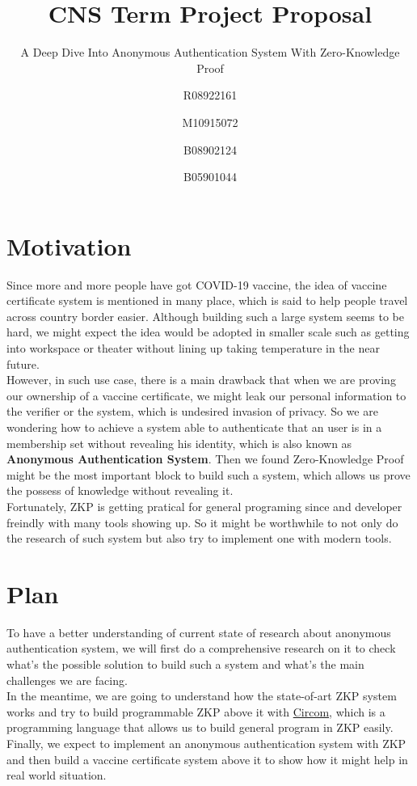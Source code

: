 \documentclass[sigconf]{acmart}
\title{CNS Term Project Proposal}
\subtitle{A Deep Dive Into Anonymous Authentication System With Zero-Knowledge Proof}
\author{
    R08922161 \and
    M10915072 \and
    B08902124 \and
    B05901044
}
\begin{document}
\maketitle

\section{Motivation}
Since more and more people have got COVID-19 vaccine, the idea of vaccine
certificate system is mentioned in many place, which is said to help people
travel across country border easier. Although building such a large system
seems to be hard, we might expect the idea would be adopted in smaller scale
such as getting into workspace or theater without lining up taking temperature
in the near future. \\
However, in such use case, there is a main drawback that when we are proving
our ownership of a vaccine certificate, we might leak our personal information
to the verifier or the system, which is undesired invasion of privacy. So we
are wondering how to achieve a system able to authenticate that an user is in
a membership set without revealing his identity, which is also known as
\textbf{Anonymous Authentication System}. Then we found Zero-Knowledge Proof
might be the most important block to build such a system, which allows us prove
the possess of knowledge without revealing it. \\
Fortunately, ZKP is getting pratical for general programing since \cite{GGPR13}
and developer freindly with many tools showing up. So it might be worthwhile to
not only do the research of such system but also try to implement one with
modern tools.

\section{Plan}
To have a better understanding of current state of research about anonymous
authentication system, we will first do a comprehensive research on it to
check what's the possible solution to build such a system and what's the main
challenges we are facing. \\
In the meantime, we are going to understand how the state-of-art ZKP system
\cite{Gro16} works and try to build programmable ZKP above it with
\href{https://github.com/iden3/circom}{Circom}, which is a programming language
that allows us to build general program in ZKP easily. \\
Finally, we expect to implement an anonymous authentication system with ZKP
and then build a vaccine certificate system above it to show how it might help
in real world situation.
\end{document}
